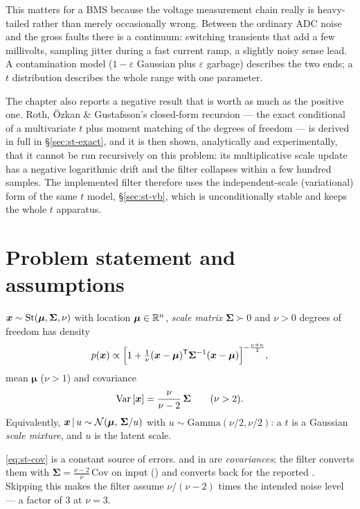 This matters for a BMS because the voltage measurement chain really is heavy-tailed rather than
merely occasionally wrong.  Between the ordinary ADC noise and the gross faults there is a
continuum: switching transients that add a few millivolts, sampling jitter during a fast current
ramp, a slightly noisy sense lead.  A contamination model ($1-\varepsilon$ Gaussian plus
$\varepsilon$ garbage) describes the two ends; a $t$ distribution describes the whole range with
one parameter.

The chapter also reports a negative result that is worth as much as the positive one.  Roth,
{\"O}zkan \& Gustafsson's closed-form recursion \cite{roth2013studentt} --- the exact conditional
of a multivariate $t$ plus moment matching of the degrees of freedom --- is derived in full in
\S\ref{sec:st-exact}, and it is then shown, analytically and experimentally, that it cannot be run
recursively on this problem: its multiplicative scale update has a negative logarithmic drift and
the filter collapses within a few hundred samples.  The implemented filter therefore uses the
independent-scale (variational) form of the same $t$ model, \S\ref{sec:st-vb}, which is
unconditionally stable and keeps the whole $t$ apparatus.

\section{Problem statement and assumptions}
\begin{definition}\label{def:st-t}
$\bm{x}\sim\mathrm{St}(\bm\mu,\bm\Sigma,\nu)$ with location $\bm\mu\in\mathbb{R}^{n}$, \emph{scale matrix}
$\bm\Sigma\succ0$ and $\nu>0$ degrees of freedom has density
\begin{equation}
p(\bm{x})\propto
\Big[1+\tfrac1\nu(\bm{x}-\bm\mu)^{\mathsf{T}}\bm\Sigma^{-1}(\bm{x}-\bm\mu)\Big]^{-\frac{\nu+n}{2}},
\label{eq:st-pdf}
\end{equation}
mean $\bm\mu$ ($\nu>1$) and covariance
\begin{equation}
\operatorname{Var}\left[\bm{x}\right]=\frac{\nu}{\nu-2}\,\bm\Sigma \qquad (\nu>2).
\label{eq:st-cov}
\end{equation}
Equivalently, $\bm{x}\,|\,u\sim\mathcal{N}\!\left(\bm\mu,\,\bm\Sigma/u\right)$ with $u\sim\mathrm{Gamma}(\nu/2,\nu/2)$: a
$t$ is a Gaussian \emph{scale mixture}, and $u$ is the latent scale.
\end{definition}

\begin{remark}\label{rem:st-scale}
\eqref{eq:st-cov} is a constant source of errors.   and  in
 are \emph{covariances}; the filter converts them with
$\bm\Sigma=\frac{\nu-2}{\nu}\,\mathrm{Cov}$ on input () and converts back
for the reported .  Skipping this makes the filter assume $\nu/(\nu-2)$ times the
intended noise level --- a factor of $3$ at $\nu=3$.
\end{remark}

